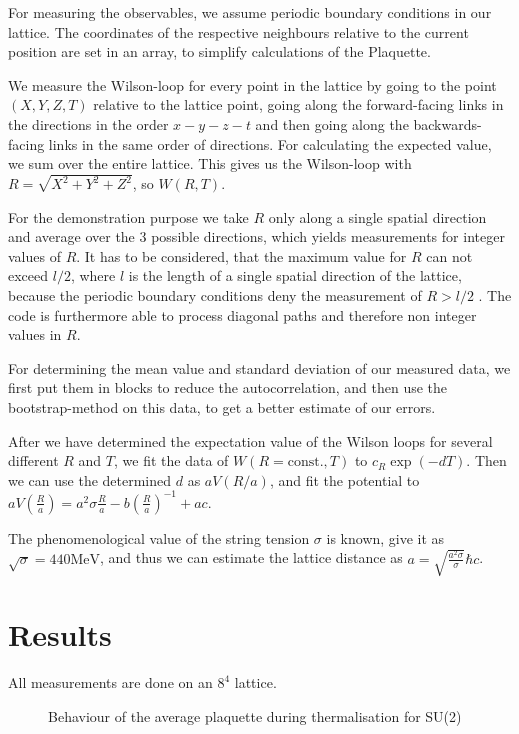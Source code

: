 \documentclass[%
 reprint,
 amsmath,amssymb,
 aps,
]{revtex4-1}
\begin{document}
For measuring the observables, we assume periodic boundary conditions in our lattice. The coordinates of the respective neighbours relative to the current position are set in an array, to simplify calculations of the Plaquette.

We measure the Wilson-loop for every point in the lattice by going to the point $(X,Y,Z,T)$ relative to the lattice point, going along the forward-facing links in the directions in the order $x-y-z-t$ and then going along the backwards-facing links in the same order of directions. For calculating the expected value, we sum over the entire lattice. This gives us the Wilson-loop with $R=\sqrt{X^2+Y^2+Z^2}$, so $W(R, T)$. 

For the demonstration purpose we take $R$ only along a single spatial direction and average over the $3$ possible directions, which yields measurements for integer values of $R$. It has to be considered, that the maximum value for $R$ can not exceed $l/2$, where $l$ is the length of a single spatial direction of the lattice, because the periodic boundary conditions deny the measurement of $R>l/2$ .
The code is furthermore able to process diagonal paths and therefore non integer values in $R$. 

For determining the mean value and standard deviation of our measured data, we first put them in blocks to reduce the autocorrelation, and then use the bootstrap-method on this data, to get a better estimate of our errors.

After we have determined the expectation value of the Wilson loops for several different $R$ and $T$, we fit the data of $W(R=\text{const.}, T)$ to $c_R\exp(-dT)$. Then we can use the determined $d$ as $aV(R/a)$, and fit the potential to $aV\left(\frac{R}{a}\right)=a^2\sigma \frac{R}{a}-b\left(\frac{R}{a}\right)^{-1}+ac$.

The phenomenological value of the string tension $\sigma$ is known, \citet{Cardoso_2011} give it as $\sqrt{\sigma}=440\si{\mega\electronvolt}$, and thus we can estimate the lattice distance as $a=\sqrt{\frac{a^2\sigma}{\sigma}}\hbar c$.

\section{Results}

All measurements are done on an $8^4$ lattice.

 \begin{figure}
 	\centering

\caption[Behaviour of the plaquette for SU(2)]{Behaviour of the average plaquette during thermalisation for SU(2)}
\label{fig:comparisoncreutz}
\end{figure} 
\end{document}
